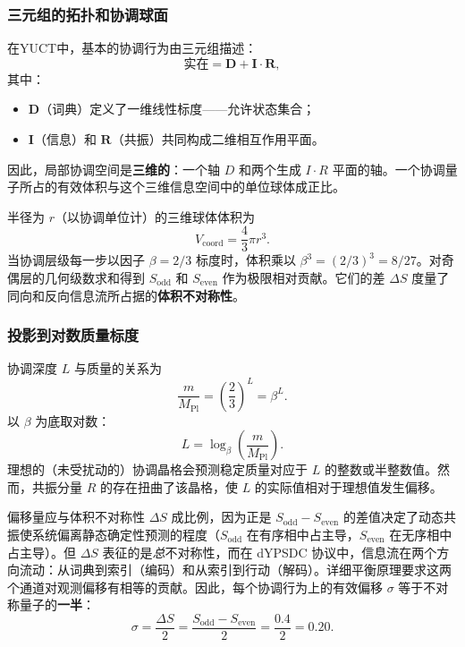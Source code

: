 \documentclass[12pt,a4paper]{article}
\begin{document}
	\subsubsection{三元组的拓扑和协调球面}
	
	在YUCT中，基本的协调行为由三元组描述：
	\[
	\text{实在} = \mathbf{D} + \mathbf{I}\cdot\mathbf{R},
	\]
	其中：
	\begin{itemize}
		\item \(\mathbf{D}\)（词典）定义了一维线性标度——允许状态集合；
		\item \(\mathbf{I}\)（信息）和 \(\mathbf{R}\)（共振）共同构成二维相互作用平面。
	\end{itemize}
	因此，局部协调空间是\textbf{三维的}：一个轴 \(D\) 和两个生成 \(I\cdot R\) 平面的轴。一个协调量子所占的有效体积与这个三维信息空间中的单位球体成正比。
	
	半径为 \(r\)（以协调单位计）的三维球体体积为
	\[
	V_{\text{coord}} = \frac{4}{3}\pi r^3.
	\]
	当协调层级每一步以因子 \(\beta = 2/3\) 标度时，体积乘以 \(\beta^3 = (2/3)^3 = 8/27\)。对奇偶层的几何级数求和得到 \(S_{\mathrm{odd}}\) 和 \(S_{\mathrm{even}}\) 作为极限相对贡献。它们的差 \(\Delta S\) 度量了同向和反向信息流所占据的\textbf{体积不对称性}。
	
	\subsubsection{投影到对数质量标度}
	
	协调深度 \(L\) 与质量的关系为
	\[
	\frac{m}{M_{\mathrm{Pl}}} = \left(\frac{2}{3}\right)^L = \beta^L.
	\]
	以 \(\beta\) 为底取对数：
	\[
	L = \log_{\beta}\left(\frac{m}{M_{\mathrm{Pl}}}\right).
	\]
	理想的（未受扰动的）协调晶格会预测稳定质量对应于 \(L\) 的整数或半整数值。然而，共振分量 \(R\) 的存在扭曲了该晶格，使 \(L\) 的实际值相对于理想值发生偏移。
	
	偏移量应与体积不对称性 \(\Delta S\) 成比例，因为正是 \(S_{\mathrm{odd}} - S_{\mathrm{even}}\) 的差值决定了动态共振使系统偏离静态确定性预测的程度（\(S_{\mathrm{odd}}\) 在有序相中占主导，\(S_{\mathrm{even}}\) 在无序相中占主导）。但 \(\Delta S\) 表征的是\textit{总}不对称性，而在 dYPSDC 协议中，信息流在两个方向流动：从词典到索引（编码）和从索引到行动（解码）。详细平衡原理要求这两个通道对观测偏移有相等的贡献。因此，每个协调行为上的有效偏移 \(\sigma\) 等于不对称量子的\textbf{一半}：
	\begin{equation}
		\boxed{\sigma = \frac{\Delta S}{2} = \frac{S_{\mathrm{odd}} - S_{\mathrm{even}}}{2} = \frac{0.4}{2} = 0.20.}
		\label{eq:sigma_final}
	\end{equation}
	
\end{document}
